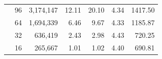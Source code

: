 \begin{table}[]
\begin{tabular}{|l|c|r|r|r|r|r|}
                                & 96                                                           & 3,174,147                                                                           & 12.11                                                                                    & 20.10                                                                                                        & 4.34                                                                                           & 1417.50                                                                                          \\ \cline{2-7} 
                                & 64                                                           & 1,694,339                                                                           & 6.46                                                                                     & 9.67                                                                                                         & 4.33                                                                                           & 1185.87                                                                                          \\ \cline{2-7} 
                                & 32                                                           & 636,419                                                                             & 2.43                                                                                     & 2.98                                                                                                         & 4.43                                                                                           & 720.25                                                                                           \\ \cline{2-7} 
                                & 16                                                           & 265,667                                                                             & 1.01                                                                                     & 1.02                                                                                                         & 4.40                                                                                           & 690.81                                                                                           \\ \hline
    \end{tabular}
    \caption[]{}
    \label{tab_resource}
\end{table}